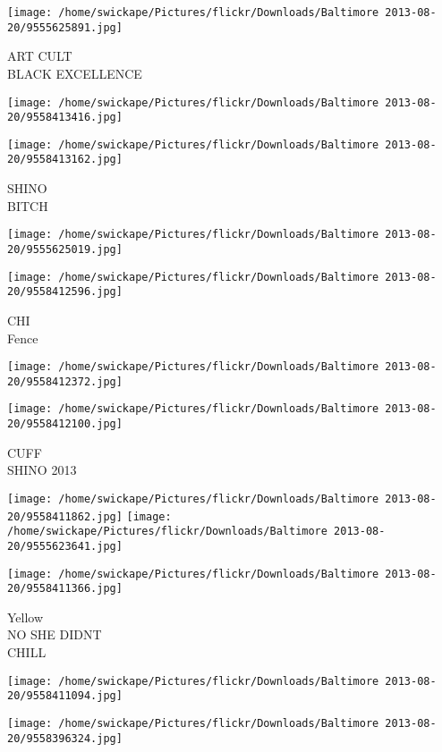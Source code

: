 \documentclass[10pt,letterpaper]{article}
\begin{document}
\vspace{0.25in}
\texttt{[image: /home/swickape/Pictures/flickr/Downloads/Baltimore 2013-08-20/9555625891.jpg]}

ART CULT\\
BLACK EXCELLENCE
\pagebreak

\texttt{[image: /home/swickape/Pictures/flickr/Downloads/Baltimore 2013-08-20/9558413416.jpg]}

\vspace{0.25in}
\texttt{[image: /home/swickape/Pictures/flickr/Downloads/Baltimore 2013-08-20/9558413162.jpg]}

SHINO\\
BITCH
\pagebreak

\texttt{[image: /home/swickape/Pictures/flickr/Downloads/Baltimore 2013-08-20/9555625019.jpg]}

\vspace{0.25in}
\texttt{[image: /home/swickape/Pictures/flickr/Downloads/Baltimore 2013-08-20/9558412596.jpg]}

CHI\\
Fence
\pagebreak

\texttt{[image: /home/swickape/Pictures/flickr/Downloads/Baltimore 2013-08-20/9558412372.jpg]}

\vspace{0.25in}
\texttt{[image: /home/swickape/Pictures/flickr/Downloads/Baltimore 2013-08-20/9558412100.jpg]}

CUFF\\
SHINO 2013
\pagebreak

\texttt{[image: /home/swickape/Pictures/flickr/Downloads/Baltimore 2013-08-20/9558411862.jpg]}
\texttt{[image: /home/swickape/Pictures/flickr/Downloads/Baltimore 2013-08-20/9555623641.jpg]}

\vspace{0.25in}
\texttt{[image: /home/swickape/Pictures/flickr/Downloads/Baltimore 2013-08-20/9558411366.jpg]}

Yellow\\
NO SHE DIDNT\\
CHILL
\pagebreak

\texttt{[image: /home/swickape/Pictures/flickr/Downloads/Baltimore 2013-08-20/9558411094.jpg]}

\vspace{0.25in}
\texttt{[image: /home/swickape/Pictures/flickr/Downloads/Baltimore 2013-08-20/9558396324.jpg]}
\end{document}
